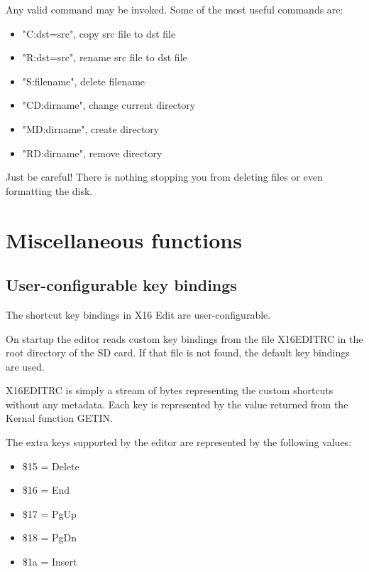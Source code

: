 \documentclass{article}
\begin{document}
        Any valid command may be invoked. Some of the most useful commands are:

     \begin{itemize} 
            \item "C:dst=src", copy src file to dst file
            \item "R:dst=src", rename src file to dst file
            \item "S:filename", delete filename
            \item "CD:dirname", change current directory
            \item "MD:dirname", create directory
            \item "RD:dirname", remove directory
    \end{itemize}
    
        Just be careful! There is nothing stopping you from deleting files or even formatting the
        disk.

\section{Miscellaneous functions}

    \subsection{User-configurable key bindings}
        The shortcut key bindings in X16 Edit are user-configurable.

        On startup the editor reads custom key bindings from the file X16EDITRC in the root directory
        of the SD card. If that file is not found, the default key bindings are
        used.
        
        X16EDITRC is simply a stream of bytes representing the custom shortcuts without any metadata. 
        Each key is represented by the value returned from the Kernal function GETIN.
        
        The extra keys supported by the editor are represented by the following values:
        
        \begin{itemize}
            \item \$15 = Delete
            \item \$16 = End
            \item \$17 = PgUp
            \item \$18 = PgDn
            \item \$1a = Insert 
        \end{itemize}
        
\end{document}
